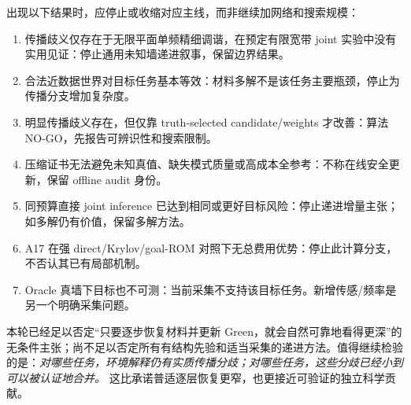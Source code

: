 出现以下结果时，应停止或收缩对应主线，而非继续加网络和搜索规模：
\begin{enumerate}
\item 传播歧义仅存在于无限平面单频精细调谐，在预定有限宽带 joint 实验中没有实用见证：停止通用未知墙递进叙事，保留边界结果。
\item 合法近数据世界对目标任务基本等效：材料多解不是该任务主要瓶颈，停止为传播分支增加复杂度。
\item 明显传播歧义存在，但仅靠 truth-selected candidate/weights 才改善：算法 NO-GO，先报告可辨识性和搜索限制。
\item 压缩证书无法避免未知真值、缺失模式质量或高成本全参考：不称在线安全更新，保留 offline audit 身份。
\item 同预算直接 joint inference 已达到相同或更好目标风险：停止递进增量主张；如多解仍有价值，保留多解方法。
\item A17 在强 direct/Krylov/goal-ROM 对照下无总费用优势：停止此计算分支，不否认其已有局部机制。
\item Oracle 真墙下目标也不可测：当前采集不支持该目标任务。新增传感/频率是另一个明确采集问题。
\end{enumerate}

本轮已经足以否定“只要逐步恢复材料并更新 Green，就会自然可靠地看得更深”的无条件主张；尚不足以否定所有有结构先验和适当采集的递进方法。值得继续检验的是：\emph{对哪些任务，环境解释仍有实质传播分歧；对哪些任务，这些分歧已经小到可以被认证地合并。} 这比承诺普适逐层恢复更窄，也更接近可验证的独立科学贡献。
